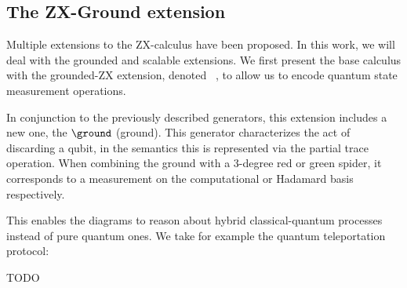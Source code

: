 \subsection{The ZX-Ground extension}
Multiple extensions to the ZX-calculus have been proposed. In this work, we will
deal with the grounded and scalable extensions. We first present the base calculus
with the grounded-ZX extension, denoted \zxGND~\cite{ground}, to allow us to encode
quantum state measurement operations.

In conjunction to the previously described generators, this extension includes a
new one, the $\ground$ (ground). This generator characterizes the act of discarding
a qubit, in the semantics this is represented via the partial trace operation.
When combining the ground with a 3-degree red or green spider, it corresponds
to a measurement on the computational or Hadamard basis respectively. 


This enables the diagrams to reason about hybrid classical-quantum processes instead
of pure quantum ones. We take for example the quantum teleportation protocol:

\begin{example}
{\color{red} TODO}
\end{example}


